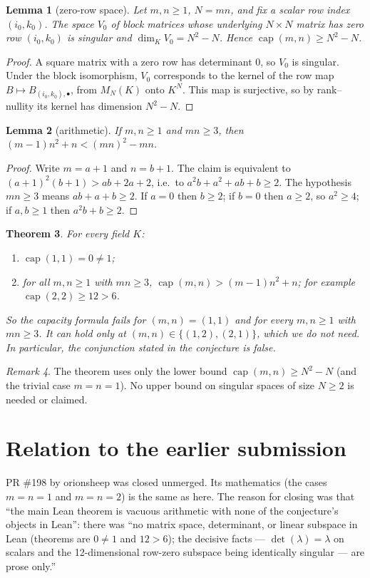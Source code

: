 \documentclass[11pt]{article}
\renewcommand{\_}{\oldus\allowbreak}
\newtheorem{theorem}{Theorem}
\newtheorem{lemma}[theorem]{Lemma}
\theoremstyle{definition}
\theoremstyle{remark}
\newtheorem{remark}[theorem]{Remark}
\begin{document}
\begin{lemma}[zero-row space]
Let $m,n\ge1$, $N=mn$, and fix a scalar row index $(i_0,k_0)$. The space $V_0$ of block matrices whose
underlying $N\times N$ matrix has zero row $(i_0,k_0)$ is singular and $\dim_K V_0=N^2-N$. Hence
$\operatorname{cap}(m,n)\ge N^2-N$.
\end{lemma}
\begin{proof}
A square matrix with a zero row has determinant $0$, so $V_0$ is singular. Under the block isomorphism,
$V_0$ corresponds to the kernel of the row map $B\mapsto B_{(i_0,k_0),\bullet}$, from $M_N(K)$ onto
$K^N$. This map is surjective, so by rank--nullity its kernel has dimension $N^2-N$.
\end{proof}

\begin{lemma}[arithmetic]
If $m,n\ge1$ and $mn\ge3$, then $(m-1)n^2+n<(mn)^2-mn$.
\end{lemma}
\begin{proof}
Write $m=a+1$ and $n=b+1$. The claim is equivalent to
$(a+1)^2(b+1)>ab+2a+2$, i.e.\ to $a^2b+a^2+ab+b\ge2$. The hypothesis $mn\ge3$ means
$ab+a+b\ge2$. If $a=0$ then $b\ge2$; if $b=0$ then $a\ge2$, so $a^2\ge4$; if $a,b\ge1$ then
$a^2b+b\ge2$.
\end{proof}

\begin{theorem}
For every field $K$:
\begin{enumerate}
\item $\operatorname{cap}(1,1)=0\neq1$;
\item for all $m,n\ge1$ with $mn\ge3$, $\operatorname{cap}(m,n)>(m-1)n^2+n$; for example
$\operatorname{cap}(2,2)\ge12>6$.
\end{enumerate}
So the capacity formula fails for $(m,n)=(1,1)$ and for every $m,n\ge1$ with $mn\ge3$. It can hold only at
$(m,n)\in\{(1,2),(2,1)\}$, which we do not need. In particular, the conjunction stated in the conjecture
is false.
\end{theorem}

\begin{remark}
The theorem uses only the lower bound $\operatorname{cap}(m,n)\ge N^2-N$ (and the trivial case
$m=n=1$). No upper bound on singular spaces of size $N\ge2$ is needed or claimed.
\end{remark}

\section{Relation to the earlier submission}
PR \#198 by orionsheep was closed unmerged. Its mathematics (the cases $m=n=1$ and $m=n=2$) is the same as
here. The reason for closing was that ``the main Lean theorem is vacuous arithmetic with none of the
conjecture's objects in Lean'': there was ``no matrix space, determinant, or linear subspace in Lean
(theorems are $0\ne1$ and $12>6$); the decisive facts --- $\det(\lambda)=\lambda$ on scalars and the
12-dimensional row-zero subspace being identically singular --- are prose only.''
\end{document}
